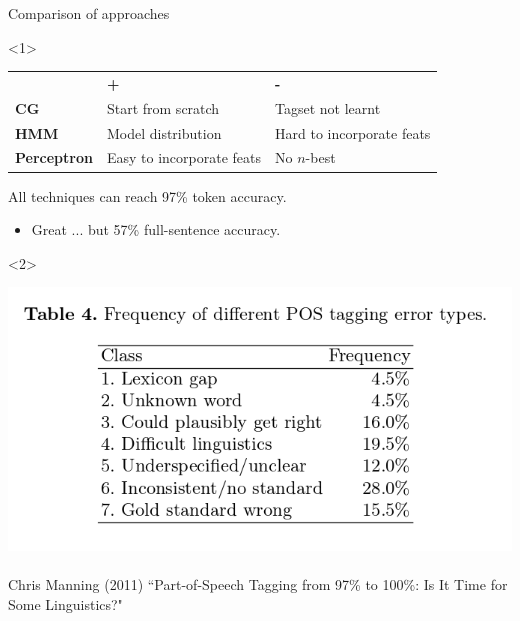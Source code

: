 \documentclass{beamer}
\begin{document}
\begin{frame}{Comparison of approaches}


\begin{onlyenv}<1>
\begin{center}
\begin{tabular}{lll}
   & \textbf{+} & \textbf{-}  \\
\textbf{CG} & Start from scratch & Tagset not learnt \\
\textbf{HMM} & Model distribution & Hard to incorporate feats \\
\textbf{Perceptron} & Easy to incorporate feats & No $n$-best  \\
\end{tabular}
\end{center}

All techniques can reach 97\% token accuracy.
\begin{itemize}
  \item Great ... but 57\% full-sentence accuracy.
\end{itemize}
\end{onlyenv}
\begin{onlyenv}<2>

\includegraphics[width=\textwidth]{images/manning-errors.png}
~\\
Chris Manning (2011) ``Part-of-Speech Tagging from 97\% to 100\%: Is It Time for Some Linguistics?"
\end{onlyenv}


\end{frame}
\end{document}
